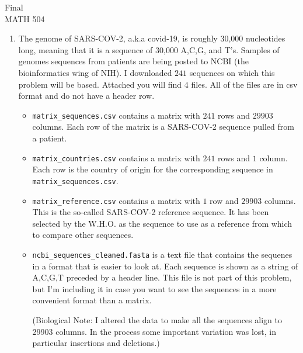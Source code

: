 \documentclass[11pt]{article}
\begin{document}
\large
\begin{center}
Final \\
MATH 504
\end{center}


\normalsize

\begin{enumerate}
\item The genome of SARS-COV-2, a.k.a covid-19, is roughly 30,000 nucleotides long, meaning that it is a sequence of 30,000 A,C,G, and T's.    Samples of genomes sequences from patients are being posted to NCBI (the bioinformatics wing of NIH).   I downloaded $241$ sequences on which this problem will be based.   Attached you will find $4$ files.  All of the files are in csv format and do not have a header row.
\begin{itemize}
\item  \verb+matrix_sequences.csv+ contains a matrix with $241$ rows and $29903$ columns.   Each row of the matrix is a SARS-COV-2 sequence pulled from a patient.  
\item  \verb+matrix_countries.csv+ contains a matrix with $241$ rows and $1$ column.  Each row is the country of origin for the corresponding sequence in \verb+matrix_sequences.csv+.  
\item \verb+matrix_reference.csv+ contains a matrix with $1$ row and $29903$ columns.  This is the so-called SARS-COV-2 reference sequence.  It has been selected by the W.H.O. as the sequence to use as a reference from which to compare other sequences.  
\item \verb+ncbi_sequences_cleaned.fasta+ is a text file that contains the sequenes in a format that is easier to look at.  Each sequence is shown as a string of A,C,G,T preceded by a header line.   This file is not part of this problem, but I'm including it in case you want to see the sequences in a more convenient format than a matrix.

\vspace{.2cm}

(Biological Note:   I altered the data to make all the sequences align to 29903 columns.   In the process some important variation was lost, in particular insertions and deletions.)

\end{itemize}


\end{enumerate}
\end{document}
